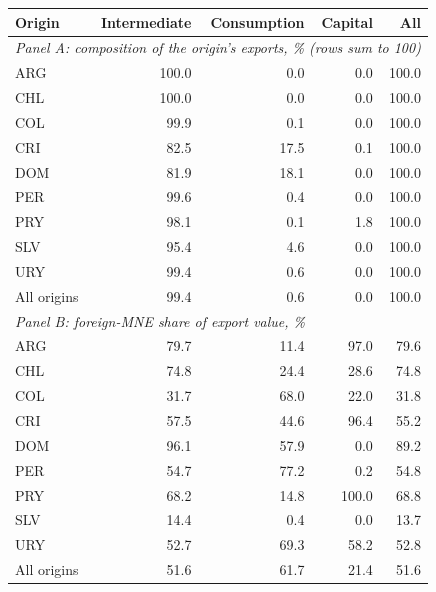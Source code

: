 \begin{tabular}{lrrrr}
\toprule
Origin & Intermediate & Consumption & Capital & All \\
\midrule
\multicolumn{5}{l}{\textit{Panel A: composition of the origin's exports, \% (rows sum to 100)}} \\
ARG & 100.0 & 0.0 & 0.0 & 100.0 \\
CHL & 100.0 & 0.0 & 0.0 & 100.0 \\
COL & 99.9 & 0.1 & 0.0 & 100.0 \\
CRI & 82.5 & 17.5 & 0.1 & 100.0 \\
DOM & 81.9 & 18.1 & 0.0 & 100.0 \\
PER & 99.6 & 0.4 & 0.0 & 100.0 \\
PRY & 98.1 & 0.1 & 1.8 & 100.0 \\
SLV & 95.4 & 4.6 & 0.0 & 100.0 \\
URY & 99.4 & 0.6 & 0.0 & 100.0 \\
All origins & 99.4 & 0.6 & 0.0 & 100.0 \\
\midrule
\multicolumn{5}{l}{\textit{Panel B: foreign-MNE share of export value, \%}} \\
ARG & 79.7 & 11.4 & 97.0 & 79.6 \\
CHL & 74.8 & 24.4 & 28.6 & 74.8 \\
COL & 31.7 & 68.0 & 22.0 & 31.8 \\
CRI & 57.5 & 44.6 & 96.4 & 55.2 \\
DOM & 96.1 & 57.9 & 0.0 & 89.2 \\
PER & 54.7 & 77.2 & 0.2 & 54.8 \\
PRY & 68.2 & 14.8 & 100.0 & 68.8 \\
SLV & 14.4 & 0.4 & 0.0 & 13.7 \\
URY & 52.7 & 69.3 & 58.2 & 52.8 \\
All origins & 51.6 & 61.7 & 21.4 & 51.6 \\
\bottomrule
\end{tabular}

